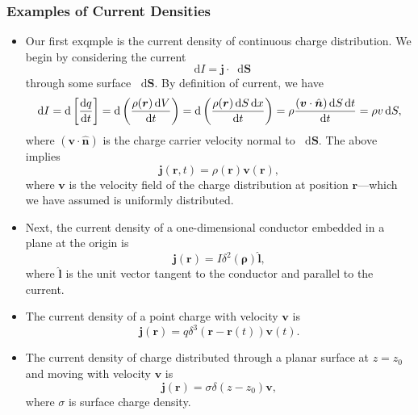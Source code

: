 \documentclass[11pt, a4paper]{article}
\newcommand{\diff}{\mathop{}\!\mathrm{d}} %
\renewcommand{\vec}[1]{\bm{#1}} %
\newcommand{\uvec}[1]{\hat{\vec{#1}}} %
\renewcommand{\r}{\vec{r}}
\renewcommand{\j}{\vec{j}}  %
\begin{document}
\subsubsection{Examples of Current Densities}
\begin{itemize}
	\item Our first exqmple is the current density of continuous charge distribution. We begin by considering the current
	\begin{equation*}
		\diff I = \vec{j}\cdot \diff \vec{S}
	\end{equation*}
	through some surface $ \diff \vec{S} $. By definition of current, we have
	\begin{equation*}
		\diff I = \diff \left[\dv{q}{t}\right] = \diff \left(\frac{\rho(\r)\diff V}{\diff t}\right) = \diff \left(\frac{\rho(\r)\diff S \diff x}{\diff t}\right)  = \rho \frac{(\vec{v} \cdot \uvec{n}) \diff S \diff t}{\diff t} = \rho v \diff S,
	\end{equation*}
	where $ (\vec{v} \cdot \uvec{n}) $ is the charge carrier velocity normal to $ \diff \vec{S} $. The above implies
	\begin{equation*}
		\vec{j}(\r, t) = \rho(\r) \vec{v}(\r),
	\end{equation*}
	where $ \vec{v} $ is the velocity field of the charge distribution at position $ \r $---which we have assumed is uniformly distributed.
	
	\item Next, the current density of a one-dimensional conductor embedded in a plane at the origin is
	\begin{equation*}
		\j(\r) = I \delta^{2}(\vec{\rho}) \uvec{l},
	\end{equation*}
	where $ \uvec{l} $ is the unit vector tangent to the conductor and parallel to the current.
	
	\item The current density of a point charge with velocity $ \vec{v} $ is
	\begin{equation*}
		\j(\r) = q \delta^{3}(\r - \r(t))\vec{v}(t).
	\end{equation*}
	
    \item The current density of charge distributed through a planar surface at $ z = z_{0} $ and moving with velocity $ \vec{v} $ is
	\begin{equation*}
		\j(\r) = \sigma \delta (z - z_{0})\vec{v},
	\end{equation*}
	where $ \sigma $ is surface charge density. 
	
\end{itemize}
\end{document}
